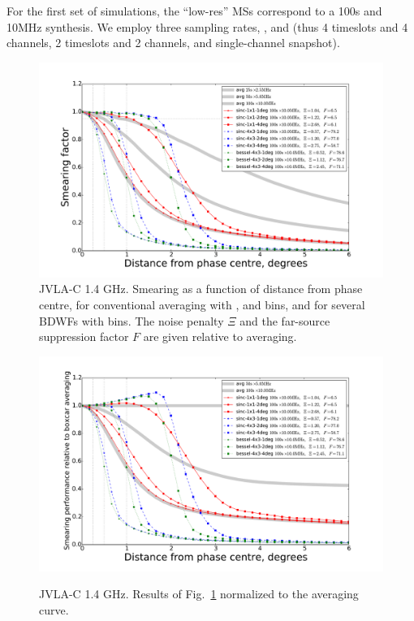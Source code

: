 \documentclass[useAMS,usenatbib]{mn2e}
\begin{document}
For the first set of simulations, the ``low-res'' MSs correspond to a 100s and 10MHz synthesis. We employ three 
sampling rates, ,  and  (thus 4 timeslots and 4 channels, 2 timeslots
and 2 channels, and single-channel snapshot).

\begin{figure}
\includegraphics[width=.9\textwidth]{./Figures/suppression-10x100-3wfs.pdf}
\caption{JVLA-C 1.4 GHz. Smearing as a function of distance from phase centre, for conventional averaging with 
,  and  bins, and for several BDWFs with  bins.
The noise penalty $\Xi$ and the far-source suppression factor $F$ are given relative to 
averaging.}
\label{fig:results-example}
\end{figure}
\begin{figure}
\includegraphics[width=.9\textwidth]{./Figures/relsuppression-10x100-3wfs.pdf}\\
\caption{JVLA-C 1.4 GHz. Results of Fig.~\ref{fig:results-example} normalized to the  averaging curve.}
\label{fig:results-example2}
\end{figure}
\end{document}
